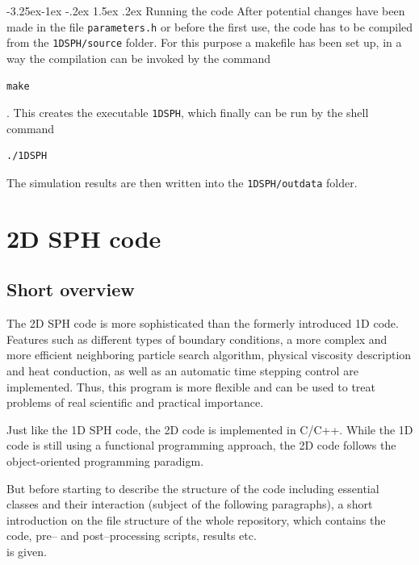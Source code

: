 \documentclass[11pt,a4paper,twoside]{report}
\makeatletter
\renewcommand\paragraph{\@startsection{paragraph}{4}{\z@}%
  {-3.25ex\@plus -1ex \@minus -.2ex}%
  {1.5ex \@plus .2ex}%
  {\normalfont\normalsize\bfseries}}
\makeatother
\begin{document}
\paragraph{Running the code}
After potential changes have been made in the file {\tt parameters.h} or before the first use, the code has to be compiled from the {\tt 1DSPH/source} folder. For this purpose a makefile has been set up, in a way the compilation can be invoked by the command
\begin{verbatim}
make
\end{verbatim}.
This creates the executable {\tt 1DSPH}, which finally can be run by the shell command
\begin{verbatim}
./1DSPH
\end{verbatim}
The simulation results are then written into the {\tt 1DSPH/outdata} folder.



\section{2D SPH code}
\label{sec:2DSPHcode}
\subsection{Short overview}
\label{sec:shortOverview2D}
The 2D SPH code is more sophisticated than the formerly introduced 1D code. Features such as different types of boundary conditions, a more complex and more efficient neighboring particle search algorithm, physical viscosity description and heat conduction, as well as an automatic time stepping control are implemented. Thus, this program is more flexible and can be used to treat problems of real scientific and practical importance. 

Just like the 1D SPH code, the 2D code is implemented in C/C++. While the 1D code is still using a functional programming approach, the 2D code follows the object-oriented programming paradigm.

But before starting to describe the structure of the code including essential classes and their interaction (subject of the following paragraphs), a short introduction on the file structure of the whole repository, which contains the code, pre-- and post--processing scripts, results etc.\\ is given.
\end{document}
